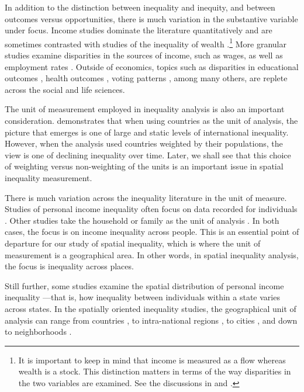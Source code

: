 \documentclass[
  a4paper, 
  twoside,
  final
]{article}
\begin{document}
In addition to the distinction between inequality and inequity, and
between outcomes versus opportunities, there is much variation in the
substantive variable under focus. Income studies dominate the literature
quantitatively \citep{gaubert2021TrendsUS} and are sometimes contrasted
with studies of the inequality of wealth
\citep{suss2024GEOWEALTHUSSpatial}.\footnote{It is important to keep in
  mind that income is measured as a flow whereas wealth is a stock. This
  distinction matters in terms of the way disparities in the two
  variables are examined. See the discussions in
  \citep{saez2016WealthInequality} and
  \citep{piketty2014CapitalTwentyfirst}.} More granular studies examine
disparities in the sources of income, such as wages, as well as
employment rates \citep{overman2022SpatialDisparities}. Outside of
economics, topics such as disparities in educational outcomes
\citep{graetz2020MappingDisparities}, health outcomes
\citep{khedmatimorasae2024SocialDeterminants}, voting patterns
\citep{barber2022400Million}, among many others, are replete across the
social and life sciences.

The unit of measurement employed in inequality analysis is also an
important consideration. \citet{sala-i-martin2006WorldDistribution}
demonstrates that when using countries as the unit of analysis, the
picture that emerges is one of large and static levels of international
inequality. However, when the analysis used countries weighted by their
populations, the view is one of declining inequality over time. Later,
we shall see that this choice of weighting versus non-weighting of the
units is an important issue in spatial inequality measurement.

There is much variation across the inequality literature in the unit of
measure. Studies of personal income inequality often focus on data
recorded for individuals \citep{piketty2003IncomeInequality}. Other
studies take the household or family as the unit of analysis
\citep{brandolini2011IncomeInequality}. In both cases, the focus is on
income inequality across people. This is an essential point of departure
for our study of spatial inequality, which is where the unit of
measurement is a geographical area. In other words, in spatial
inequality analysis, the focus is inequality across places.

Still further, some studies examine the spatial distribution of personal
income inequality
\citep{partridge1998StatePatterns, frank2009InequalityGrowth}---that is,
how inequality between individuals within a state varies across states.
In the spatially oriented inequality studies, the geographical unit of
analysis can range from countries \citep{milanovic2018GlobalInequality},
to intra-national regions \citep{ganong2017WhyHas}, to cities
\citep{u.s.departmentofcommerce2023GeographicInequality, sarkar2024SpatialInequalities},
and down to neighborhoods \citep{nijman2020UrbanInequalities}.
\end{document}
